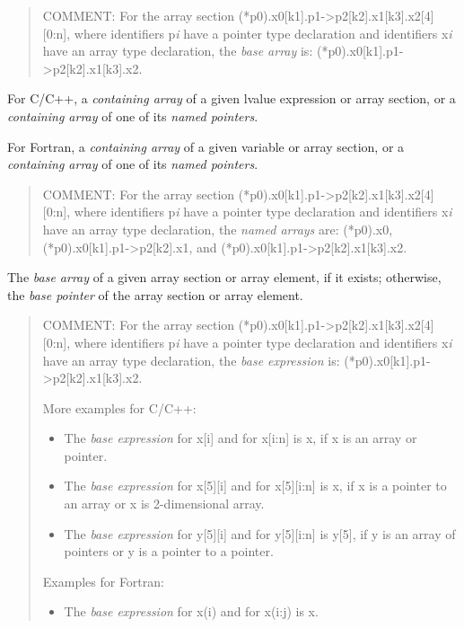 \begin{quote}
COMMENT: For the array section (*p0).x0[k1].p1->p2[k2].x1[k3].x2[4][0:n],
where identifiers p\emph{i} have a pointer type declaration
and identifiers x\emph{i} have an array type declaration, 
the \emph{base array} is: (*p0).x0[k1].p1->p2[k2].x1[k3].x2.
\end{quote}
\glossarydefend

\glossarydefstart
For C/C++, a \emph{containing array} of a given lvalue expression or array 
section, or a \emph{containing array} of one of its \emph{named pointers}.

For Fortran, a \emph{containing array} of a given variable or array section, or
a \emph{containing array} of one of its \emph{named pointers}.

\begin{quote}
COMMENT: For the array section (*p0).x0[k1].p1->p2[k2].x1[k3].x2[4][0:n],
where identifiers p\emph{i} have a pointer type declaration
and identifiers x\emph{i} have an array type declaration, 
the \emph{named arrays} are:
(*p0).x0,
    (*p0).x0[k1].p1->p2[k2].x1,
and 
(*p0).x0[k1].p1->p2[k2].x1[k3].x2.
\end{quote}

\glossarydefend

\glossarydefstart
The \emph{base array} of a given array section or array element, if
it exists; otherwise, the \emph{base pointer} of the array section or array
element.

\begin{quote}
COMMENT: For the array section (*p0).x0[k1].p1->p2[k2].x1[k3].x2[4][0:n],
where identifiers p\emph{i} have a pointer type declaration and
identifiers x\emph{i} have an array type declaration, the
\emph{base expression} is:
(*p0).x0[k1].p1->p2[k2].x1[k3].x2.

More examples for C/C++:
\begin{itemize}
\item The \emph{base expression} for x[i] and for 
    x[i:n] is x, if x is an array or pointer.
\item The \emph{base expression} for x[5][i] and for x[5][i:n] is x, if x is a
    pointer to an array or x is 2-dimensional array.
\item The \emph{base expression} for y[5][i] and for y[5][i:n] is y[5], if
    y is an array of pointers or y is a pointer to a pointer.
\end{itemize}
Examples for Fortran:
\begin{itemize}
\item The \emph{base expression} for x(i) and for x(i:j) is x.
\end{itemize}
\end{quote}
\glossarydefend


